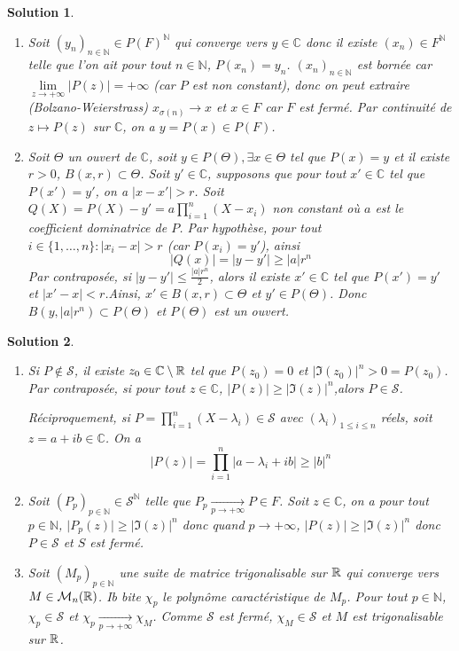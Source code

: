 \documentclass[12pt]{article}
\newtheorem{solution}{Solution}[section]
\theoremstyle{remark}
\newcommand{\C}{\mathbb{C}} \newcommand{\Q}{\mathbb{Q}}
\newcommand{\N}{\mathbb{N}} \newcommand{\Z}{\mathbb{Z}}
\newcommand{\M}{\mathcal{M}} \renewcommand{\L}{\mathcal{L}}
\numberwithin{equation}{section}
\begin{document}
\begin{solution}
	\phantom{}
	\begin{enumerate}
		\item Soit $(y_{n})_{n\in\N}\in P(F)^{\N}$ qui converge vers $y\in\C$ donc il existe $(x_{n})\in F^{\N}$ telle que l'on ait pour tout $n\in\N$, $P(x_{n})=y_{n}$. $(x_{n})_{n\in\N}$ est bornée car $\lim\limits_{z\to+\infty}\vert P(z)\vert=+\infty$ (car $P$ est non constant), donc on peut extraire (Bolzano-Weierstrass) $x_{\sigma(n)}\to x$ et $x\in F$ car $F$ est fermé. Par continuité de $z\mapsto P(z)$ sur $\C$, on a $y=P(x)\in P(F)$.
		
		\item Soit $\Theta$ un ouvert de $\C$, soit $y\in P(\Theta),\exists x\in\Theta$ tel que $P(x)=y$ et il existe $r>0$, $B(x,r)\subset\Theta$. Soit $y'\in\C$, supposons que pour tout $x'\in\C$ tel que $P(x')=y'$, on a $\vert x-x'\vert>r$. Soit $Q(X)=P(X)-y'=a\prod_{i=1}^{n}(X-x_{i})$ non constant où $a$ est le coefficient dominatrice de $P$. Par hypothèse, pour tout $i\in\{1,\dots,n\}\colon\vert x_{i}-x\vert>r$ (car $P(x_{i})=y'$), ainsi 
		$$\vert Q(x)\vert=\vert y-y'\vert\geqslant\vert a\vert r^{n}$$
		Par contraposée, si $\vert y-y'\vert\leqslant\frac{\vert a\vert r^{n}}{2}$, alors il existe $x'\in\C$ tel que $P(x')=y'$ et $\vert x'-x\vert<r$.Ainsi, $x'\in B(x,r)\subset\Theta$ et $y'\in P(\Theta)$. Donc $B(y,\vert a\vert r^{n})\subset P(\Theta)$ et $P(\Theta)$ est un ouvert.
	\end{enumerate}
\end{solution}

\begin{solution}
	\phantom{}
	\begin{enumerate}
		\item Si $P\notin\mathcal{S}$, il existe $z_{0}\in\C\setminus\R$ tel que $P(z_{0})=0$ et $\vert\Im(z_{0})\vert^{n}>0=P(z_{0})$. Par contraposée, si pour tout $z\in\C$, $\vert P(z)\vert\geqslant\vert\Im(z_{})\vert^{n}$,alors $P\in\mathcal{S}$.

		Réciproquement, si $P=\prod_{i=1}^{n}(X-\lambda_{i})\in\mathcal{S}$ avec $(\lambda_{i})_{1\leqslant i\leqslant n}$ réels, soit $z=a+ib\in\C$. On a
		$$\vert P(z)\vert=\prod_{i=1}^{n}\vert a-\lambda_{i}+ib\vert\geqslant\vert b\vert^{n}$$
		
		\item Soit $(P_{p})_{p\in\N}\in\mathcal{S}^{\N}$ telle que $P_{p}\xrightarrow[p\to+\infty]{}P\in F$. Soit $z\in\C$, on a pour tout $p\in\N$, $\vert P_{p}(z)\vert\geqslant\vert\Im(z)\vert^{n}$ donc quand $p\to+\infty$, $\vert P(z)\vert\geqslant\vert\Im(z)\vert^{n}$ donc $P\in\mathcal{S}$ et $S$ est fermé.
		
		\item Soit $(M_{p})_{p\in\N}$ une suite de matrice trigonalisable sur $\mathbb{R}$ qui converge vers $M\in\M_{n}(\R)$. Ib bite $\chi_{p}$ le polynôme caractéristique de $M_{p}$. Pour tout $p\in\N$, $\chi_{p}\in\mathcal{S}$ et $\chi_{p}\xrightarrow[p\to+\infty]{}\chi_{M}$. Comme $\mathcal{S}$ est fermé, $\chi_{M}\in \mathcal{S}$ et $M$ est trigonalisable sur $\mathbb{R}$.
	\end{enumerate}
\end{solution}
\end{document}
